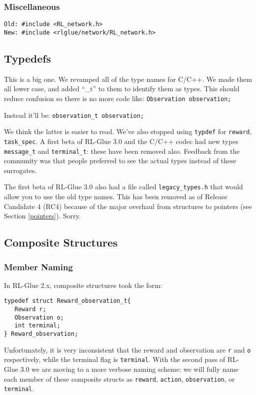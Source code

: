 \documentclass[11pt]{article}
\begin{document}
\subsubsection{Miscellaneous}
\begin{verbatim}
Old: #include <RL_network.h>
New: #include <rlglue/network/RL_network.h>
\end{verbatim}

\subsection{Typedefs}
This is a big one. We revamped all of the type names for C/C++.  We made them all lower case, and added ``\_t'' to them to identify them as types.  This should reduce confusion so there is no more code like:\newline
\texttt{Observation observation;}

Instead it'll be:\newline
\texttt{observation\_t observation;}

We think the latter is easier to read.  We've also stopped using \texttt{typdef} for \texttt{reward}, \texttt{task\_spec}.  A first beta of RL-Glue 3.0 and the C/C++ codec had new types \texttt{message\_t} and \texttt{terminal\_t}: these have been removed also.  Feedback from the community was that people preferred to see the actual types instead of these surrogates.

The first beta of RL-Glue 3.0 also had a file called \texttt{legacy\_types.h} that would allow you to use the old type names.  This has been removed as of Release Candidate 4 (RC4) because of the major overhaul from structures to pointers (see Section \ref{pointers}). Sorry. 

\subsection{Composite Structures}

\subsubsection{Member Naming}
In RL-Glue 2.x, composite structures took the form:
\begin{verbatim}
typedef struct Reward_observation_t{
   Reward r;
   Observation o;
   int terminal;
} Reward_observation;
\end{verbatim}

Unfortunately, it is very inconsistent that the reward and observation are \texttt{r} and \texttt{o} respectively, 
while the terminal flag is \texttt{terminal}.  With the second pass of RL-Glue 3.0 we are moving to a more verbose 
naming scheme: we will fully name each member of these composite structs as \texttt{reward}, \texttt{action}, 
\texttt{observation}, or \texttt{terminal}.
\end{document}
